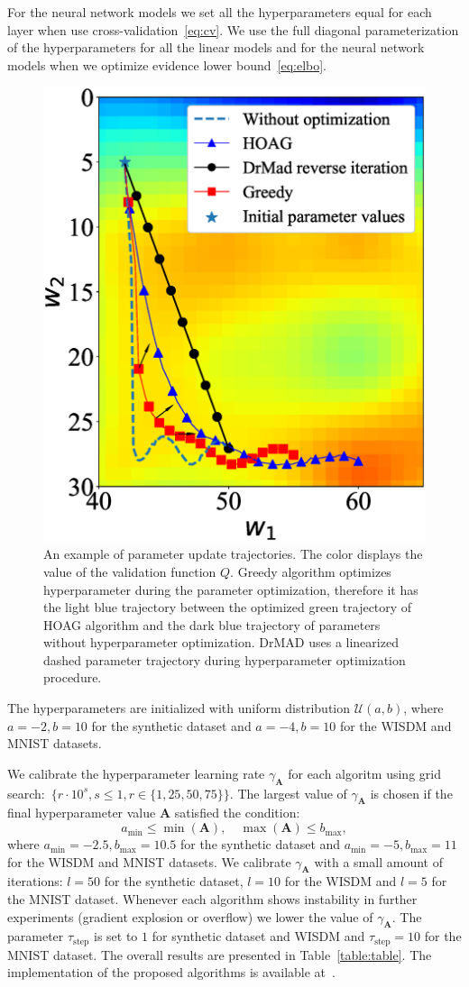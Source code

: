 \documentclass[smallcondensed]{svjour3}
\begin{document}
For the neural network models we set all the hyperparameters equal for each layer when use  cross-validation~\eqref{eq:cv}. We use the full diagonal parameterization of the hyperparameters for all the linear models and for the neural network models when we optimize evidence lower bound~\eqref{eq:elbo}.


\begin{figure}[tbh!]
    \centering
    \includegraphics[width=0.5\linewidth]{plots/Fig_traj2.eps}

    \caption{An example of parameter update trajectories. The color displays the value of the validation function $Q$. Greedy algorithm optimizes hyperparameter during the parameter optimization, therefore it has the light blue trajectory between the optimized green trajectory of HOAG algorithm and the dark blue trajectory of parameters without hyperparameter optimization. DrMAD uses a linearized dashed parameter trajectory during hyperparameter optimization procedure.  }
    \label{fig:traj}
    \end{figure}


The hyperparameters are initialized with uniform distribution $\mathcal{U}(a,b)$,
where $a = -2, b = 10$ for the synthetic dataset and $a = -4, b = 10$  for the WISDM and MNIST datasets.

We calibrate the hyperparameter learning rate $\gamma_{\mathbf{A}}$  for each algoritm using grid search:~$\{r \cdot 10^{s}, s \leq 1, r \in \{1,25,50,75\}\}$. The largest value of $\gamma_{\mathbf{A}}$ is chosen if the final hyperparameter value $\mathbf{A}$ satisfied the condition:
\[
    a_\text{min} \leq  \min(\mathbf{A}), \quad \max(\mathbf{A}) \leq b_\text{max},
\] 
where $a_\text{min} = -2.5, b_\text{max}=10.5$ for the synthetic dataset and $a_\text{min} = -5, b_\text{max}=11$ for the WISDM and MNIST datasets. We calibrate $\gamma_\mathbf{A}$ with a small amount of iterations: $l=50$ for the synthetic dataset, $l=10$ for the WISDM and $l=5$ for the MNIST dataset. Whenever each algorithm shows instability in further experiments (gradient explosion or overflow) we lower the value of $\gamma_{\mathbf{A}}$. The parameter $\tau_\text{step}$ is set to $1$ for synthetic dataset and WISDM and  $\tau_\text{step}=10$ for the MNIST dataset.
The overall results are presented in Table~\ref{table:table}. The implementation of the proposed algorithms is available at~\cite{pyfos}.
\end{document}
